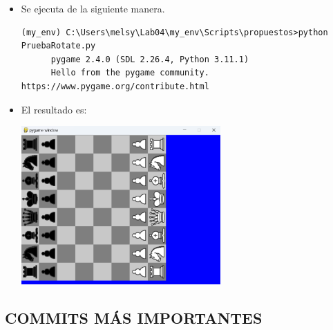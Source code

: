 \documentclass{article}
\begin{document}
\begin{itemize}
    \vspace{\baselineskip}

    \begin{itemize}
      \item Se ejecuta de la siguiente manera.

      \begin{lstlisting}[style=shell]
      (my_env) C:\Users\melsy\Lab04\my_env\Scripts\propuestos>python PruebaRotate.py
      pygame 2.4.0 (SDL 2.26.4, Python 3.11.1)
      Hello from the pygame community. https://www.pygame.org/contribute.html
      \end{lstlisting}

      \vspace{\baselineskip}

      \item El resultado es:
      
      \vspace{\baselineskip}

      \begin{minipage}{\linewidth}
        \centering
        \includegraphics[width=0.6\textwidth]{imagenes/p_ej2extra.png}
      \end{minipage}
    \end{itemize}

  \end{itemize}

\pagebreak

\subsection*{COMMITS MÁS IMPORTANTES}

\vspace{\baselineskip}
\end{document}
